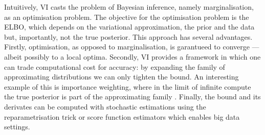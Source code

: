 Intuitively, VI casts the problem of Bayesian inference, namely marginalisation, as an optimisation problem. The objective for the optimisation problem is the ELBO, which depends on the variational approximation, the prior and the data but, importantly, not the true posterior. This approach has several advantages. Firstly, optimisation, as opposed to marginalisation, is garantueed to converge ---albeit possibly to a local optima. Secondly, VI provides a framework in which one can trade computational cost for accuracy: by expanding the family of approximating distributions we can only tighten the bound. An interesting example of this is importance weighting, where in the limit of infinite compute the true posterior is part of the approximating family \citep{Domke2018IWVI}. Finally, the bound and its derivates can be computed with stochastic estimations using the reparametrisation trick or score function estimators which enables big data settings.

